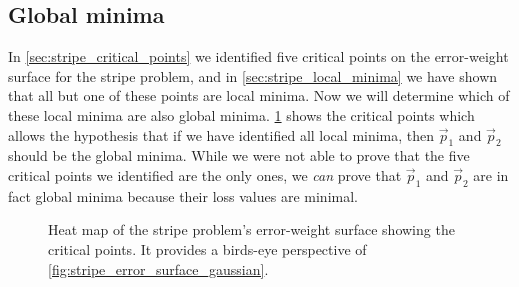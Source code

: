 \subsection{Global minima}
In \ref{sec:stripe_critical_points} we identified five critical points on the error-weight surface for the stripe problem, and in \ref{sec:stripe_local_minima} we have shown that all but one of these points are local minima.
Now we will determine which of these local minima are also global minima.
\ref{fig:stripe_critical_points} shows the critical points which allows the hypothesis that if we have identified all local minima, then $\vec{p}_1$ and $\vec{p}_2$ should be the global minima.
While we were not able to prove that the five critical points we identified are the only ones, we \textit{can} prove that $\vec{p}_1$ and $\vec{p}_2$ are in fact global minima because their loss values are minimal.
\begin{figure}
    \centering
    \caption{Heat map of the stripe problem's error-weight surface showing the critical points. It provides a birds-eye perspective of \ref{fig:stripe_error_surface_gaussian}.}
    \label{fig:stripe_critical_points}
\end{figure}


